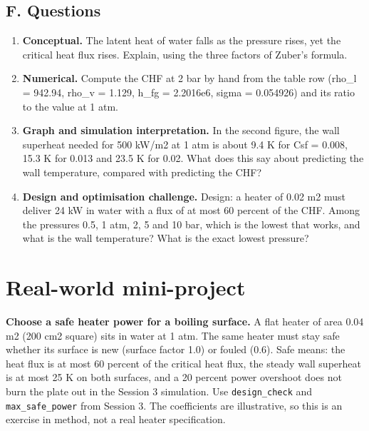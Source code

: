 \documentclass[11pt,a4paper]{article}
\begin{document}
\subsection*{F. Questions}
\begin{enumerate}[nosep]
\item \textbf{Conceptual.} The latent heat of water falls as the pressure rises, yet the critical heat flux rises. Explain, using the three factors of Zuber's formula.
\item \textbf{Numerical.} Compute the CHF at 2 bar by hand from the table row (rho\_l = 942.94, rho\_v = 1.129, h\_fg = 2.2016e6, sigma = 0.054926) and its ratio to the value at 1 atm.
\item \textbf{Graph and simulation interpretation.} In the second figure, the wall superheat needed for 500 kW/m2 at 1 atm is about 9.4 K for Csf = 0.008, 15.3 K for 0.013 and 23.5 K for 0.02. What does this say about predicting the wall temperature, compared with predicting the CHF?
\item \textbf{Design and optimisation challenge.} Design: a heater of 0.02 m2 must deliver 24 kW in water with a flux of at most 60 percent of the CHF. Among the pressures 0.5, 1 atm, 2, 5 and 10 bar, which is the lowest that works, and what is the wall temperature? What is the exact lowest pressure?
\end{enumerate}

\section{Real-world mini-project}
\textbf{Choose a safe heater power for a boiling surface.} A flat heater of area 0.04 m2 (200 cm2 square) sits in water at 1 atm. The same heater must stay safe whether its surface is new (surface factor 1.0) or fouled (0.6). Safe means: the heat flux is at most 60 percent of the critical heat flux, the steady wall superheat is at most 25 K on both surfaces, and a 20 percent power overshoot does not burn the plate out in the Session 3 simulation. Use \texttt{design\_check} and \texttt{max\_safe\_power} from Session 3. The coefficients are illustrative, so this is an exercise in method, not a real heater specification.
\end{document}
